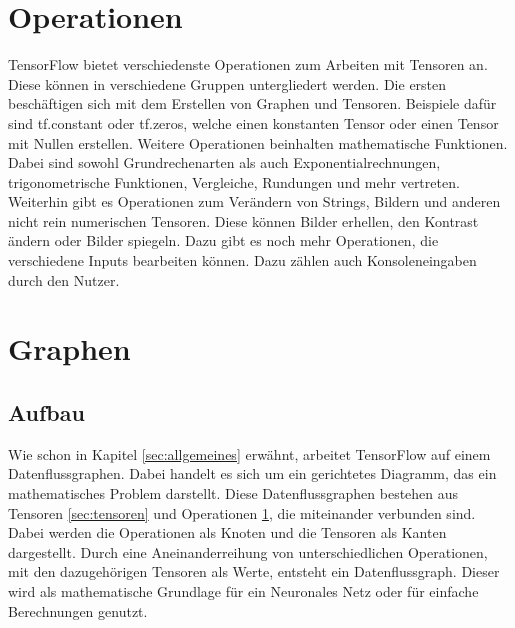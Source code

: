 \section{Operationen}
\label{sec:operationen}
\printsubchapterauthor{\authorMarco}
TensorFlow bietet verschiedenste Operationen zum Arbeiten mit Tensoren an. Diese können in verschiedene Gruppen untergliedert werden. Die ersten beschäftigen sich mit dem Erstellen von Graphen und Tensoren. Beispiele dafür sind tf.constant oder tf.zeros, welche einen konstanten Tensor oder einen Tensor mit Nullen erstellen. Weitere Operationen beinhalten mathematische Funktionen. Dabei sind sowohl Grundrechenarten als auch Exponentialrechnungen, trigonometrische Funktionen, Vergleiche, Rundungen und mehr vertreten. Weiterhin gibt es Operationen zum Verändern von Strings, Bildern und anderen nicht rein numerischen Tensoren. Diese können Bilder erhellen, den Kontrast ändern oder Bilder spiegeln. Dazu gibt es noch mehr Operationen, die verschiedene Inputs bearbeiten können. Dazu zählen auch Konsoleneingaben durch den Nutzer.

\section{Graphen}
\label{sec:graphen}
\printsubchapterauthor{\authorNiklas}
\subsection{Aufbau}
\label{sec:graphenAufbau}
Wie schon in Kapitel \ref{sec:allgemeines} erwähnt, arbeitet TensorFlow auf einem Datenflussgraphen. Dabei handelt es sich um ein gerichtetes Diagramm, das ein mathematisches Problem darstellt. Diese Datenflussgraphen bestehen aus Tensoren \ref{sec:tensoren} und Operationen \ref{sec:operationen}, die miteinander verbunden sind. Dabei werden die Operationen als Knoten und die Tensoren als Kanten dargestellt. Durch eine Aneinanderreihung von unterschiedlichen Operationen, mit den dazugehörigen Tensoren als Werte, entsteht ein Datenflussgraph. Dieser wird als mathematische Grundlage für ein Neuronales Netz oder für einfache Berechnungen genutzt.

